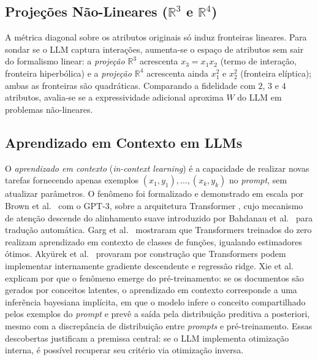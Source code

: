 \documentclass[12pt,a4paper]{article}
\newcommand{\West}{\ensuremath{\hat{W}}}   %
\begin{document}
\subsection{Projeções Não-Lineares (\texorpdfstring{$\mathbb{R}^3$ e $\mathbb{R}^4$}{R3 e R4})}
\label{sec:r3r4}

A métrica diagonal sobre os atributos originais só induz fronteiras lineares. Para
sondar se o LLM captura interações, aumenta-se o espaço de atributos sem sair do
formalismo linear: a \emph{projeção $\mathbb{R}^3$} acrescenta $x_3 = x_1 x_2$ (termo de
interação, fronteira hiperbólica) e a \emph{projeção $\mathbb{R}^4$} acrescenta ainda
$x_1^2$ e $x_2^2$ (fronteira
elíptica); ambas as fronteiras são quadráticas. Comparando a fidelidade com
$2$, $3$ e $4$ atributos, avalia-se se a expressividade adicional aproxima \West{} do
LLM em problemas não-lineares.

\subsection{Aprendizado em Contexto em LLMs}

O \emph{aprendizado em contexto} (\emph{in-context learning}) é a capacidade de realizar
novas tarefas fornecendo apenas
exemplos $(x_1,y_1),\ldots,(x_k,y_k)$ no \emph{prompt}, sem atualizar parâmetros. O
fenômeno foi formalizado e demonstrado em escala por Brown et
al.~\cite{brownLanguageModels2020} com o GPT-3, sobre a arquitetura Transformer
\cite{vaswaniAttention2017}, cujo mecanismo de atenção descende do alinhamento suave
introduzido por Bahdanau et al.~\cite{bahdanauNeuralMachine2015} para tradução
automática. Garg et
al.~\cite{gargWhatTransformers2022} mostraram que Transformers treinados do zero realizam
aprendizado em contexto de classes de funções, igualando estimadores ótimos. Akyürek et
al.~\cite{akyurekWhatLearning2023} provaram por construção que Transformers podem implementar
internamente gradiente descendente e regressão ridge. Xie et
al.~\cite{xieExplanationInContext2022} explicam por que o fenômeno emerge do
pré-treinamento: se os documentos são gerados por conceitos latentes, o aprendizado em
contexto corresponde a uma inferência bayesiana implícita, em que o modelo infere o conceito
compartilhado pelos exemplos do \emph{prompt} e prevê a saída pela distribuição preditiva a
posteriori, mesmo com a discrepância de distribuição entre \emph{prompts} e
pré-treinamento. Essas descobertas justificam a premissa
central: se o LLM implementa otimização interna, é possível recuperar seu critério via
otimização inversa.
\end{document}
